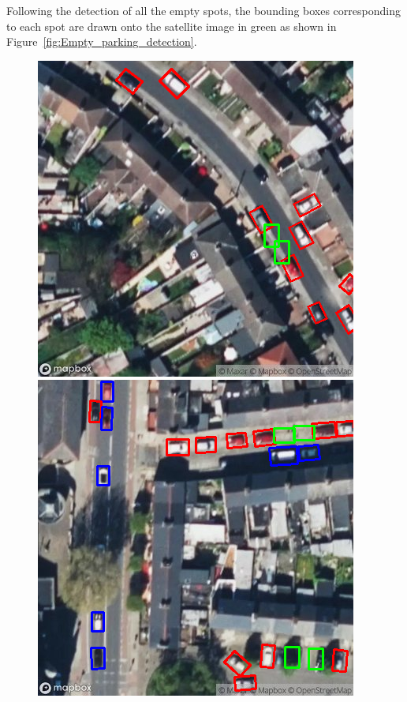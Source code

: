 Following the detection of all the empty spots, the bounding boxes corresponding to each spot are drawn onto the satellite image in green as shown in Figure~\ref{fig:Empty_parking_detection}.

\begin{figure}[htbp]
    \centering
    \begin{minipage}{0.45\textwidth}
        \centering
        \includegraphics[width=\textwidth]{images/empty_parking1.png}
    \end{minipage}
    \hfill
    \begin{minipage}{0.45\textwidth}
        \centering
        \includegraphics[width=\textwidth]{images/empty_parking2.png}

\end{minipage}
\end{figure}
